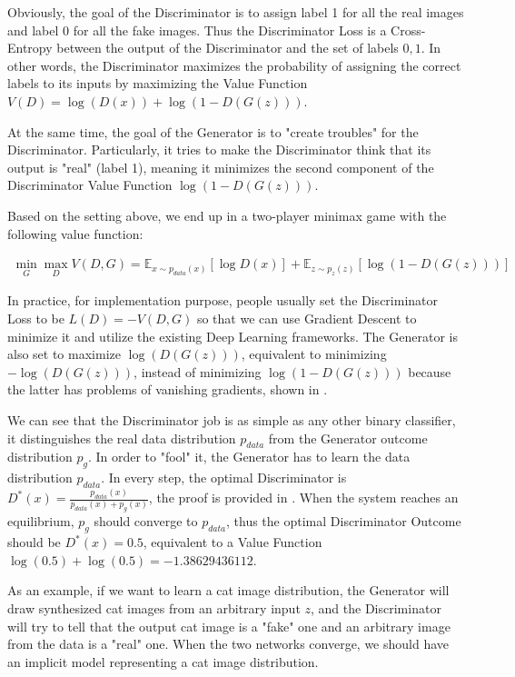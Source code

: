 Obviously, the goal of the Discriminator is to assign label 1 for all the real
images and label 0 for all the fake images. Thus the Discriminator Loss is
a Cross-Entropy between the output of the Discriminator and the set of labels ${0, 1}$. In
other words, the Discriminator maximizes the probability of assigning the correct labels
to its inputs by maximizing the Value Function $V(D) = \log(D(x)) + \log(1 - D(G(z)))$.

At the same time, the goal of the Generator is to "create troubles" for the
Discriminator. Particularly, it tries to make the Discriminator think that its output is
"real" (label 1), meaning it minimizes the second component of the Discriminator Value
Function $\log(1 - D(G(z)))$.

Based on the setting above, we end up in a two-player minimax game with the 
following value function:

\begin{align*}
	\min_{G} \max_{D} V(D, G) = \mathbb{E}_{x \sim p_{data}(x)} [\log D(x)] +
	\mathbb{E}_{z \sim p_z(z)}[\log(1 - D(G(z)))]
\end{align*}

In practice, for implementation purpose, people usually set the Discriminator Loss to be
$L(D) = -V(D, G)$ so that we can use Gradient Descent to minimize it and utilize the
existing Deep Learning frameworks. The Generator is also set to maximize $\log(D(G(z)))$,
equivalent to minimizing $-\log(D(G(z)))$, instead of minimizing $\log(1 - D(G(z)))$
because the latter has problems of vanishing gradients, shown in \cite{gan}.

We can see that the Discriminator job is as simple as any other binary classifier, it
distinguishes the real data distribution $p_{data}$ from the Generator outcome
distribution $p_{g}$. In order to "fool" it, the Generator has to learn the data
distribution $p_{data}$. In every step, the optimal Discriminator is $D^{*}(x) =
\frac{p_{data}(x)}{p_{data}(x) + p_{g}(x)}$, the proof is provided in \cite{gan}. When the system reaches an equilibrium, $p_{g}$ should converge to $p_{data}$,
thus the optimal Discriminator Outcome should be $D^*(x) = 0.5$, equivalent to a Value
Function $\log(0.5) + \log(0.5) = -1.38629436112$.

As an example, if we want to learn a cat image distribution, the Generator will draw
synthesized cat images from an arbitrary input $z$, and the Discriminator will try to tell
that the output cat image is a "fake" one and an arbitrary image from the data is a "real"
one. When the two networks converge, we should have an implicit model representing a cat
image distribution.

